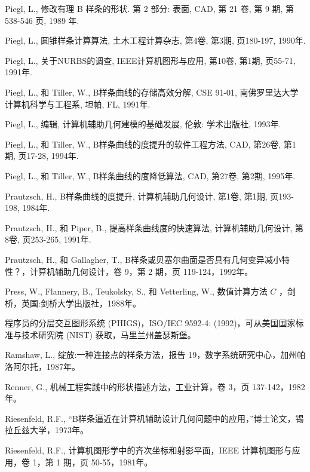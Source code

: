 \documentclass[../main.tex]{subfiles}
\begin{document}
\begin{BookBibliography}
 Piegl, L., 修改有理 B 样条的形状. 第 2 部分: 表面, CAD, 第 21 卷, 第 9 期, 第 538-546 页, 1989 年.

 Piegl, L., 圆锥样条计算算法, 土木工程计算杂志, 第4卷, 第3期, 页180-197, 1990年.

 Piegl, L., 关于NURBS的调查, IEEE计算机图形与应用, 第10卷, 第1期, 页55-71, 1991年.

 Piegl, L., 和 Tiller, W., B样条曲线的存储高效分解, CSE 91-01, 南佛罗里达大学计算机科学与工程系, 坦帕, FL, 1991年.

 Piegl, L., 编辑, 计算机辅助几何建模的基础发展, 伦敦: 学术出版社, 1993年.

 Piegl, L., 和 Tiller, W., B样条曲线的度提升的软件工程方法, CAD, 第26卷, 第1期, 页17-28, 1994年.

 Piegl, L., 和 Tiller, W., B样条曲线的度降低算法, CAD, 第27卷, 第2期, 1995年.

 Prautzsch, H., B样条曲线的度提升, 计算机辅助几何设计, 第1卷, 第1期, 页193-198, 1984年.

 Prautzsch, H., 和 Piper, B., 提高样条曲线度的快速算法, 计算机辅助几何设计, 第8卷, 页253-265, 1991年.

 Prautzsch, H., 和 Gallagher, T., B样条或贝塞尔曲面是否具有几何变异减小特性？，计算机辅助几何设计，卷 9，第 2 期，页 119-124，1992年。

 Press, W., Flannery, B., Teukolsky, S., 和 Vetterling, W., 数值计算方法 \(C\) ，剑桥，英国:剑桥大学出版社，1988年。

 程序员的分层交互图形系统 (PHIGS)，ISO/IEC 9592-4: (1992)，可从美国国家标准与技术研究院 (NIST) 获取，马里兰州盖瑟斯堡。

 Ramshaw, L., 绽放:一种连接点的样条方法，报告 19，数字系统研究中心，加州帕洛阿尔托，1987年。

 Renner, G., 机械工程实践中的形状描述方法，工业计算，卷 3，页 137-142，1982年。

 Riesenfeld, R.F., “B样条逼近在计算机辅助设计几何问题中的应用，”博士论文，锡拉丘兹大学，1973年。

 Riesenfeld, R.F., 计算机图形学中的齐次坐标和射影平面，IEEE 计算机图形与应用，卷 1，第 1 期，页 50-55，1981年。


\end{BookBibliography}
\end{document}
